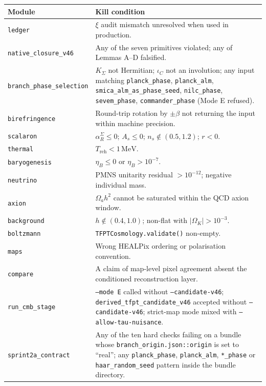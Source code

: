\documentclass[11pt,a4paper]{article}
\begin{document}
\begin{center}
\renewcommand{\arraystretch}{1.05}
\begin{tabularx}{\textwidth}{@{}p{}Y@{}}
\toprule
\textbf{Module} & \textbf{Kill condition} \\
\midrule
\texttt{ledger}        & \(\xi\) audit mismatch unresolved when used in production. \\
\texttt{native\_closure\_v46} & Any of the seven primitives violated; any of Lemmas A--D falsified. \\
\texttt{branch\_phase\_selection} & \(K_\Sigma\) not Hermitian; \(\iota_C\) not an involution; any input matching \texttt{planck\_phase}, \texttt{planck\_alm}, \texttt{smica\_alm\_as\_phase\_seed}, \texttt{nilc\_phase}, \texttt{sevem\_phase}, \texttt{commander\_phase} (Mode E refused). \\
\texttt{birefringence} & Round-trip rotation by \(\pm\beta\) not returning the input within machine precision. \\
\texttt{scalaron}      & \(\alpha_R^\Sigma\le 0\); \(A_s\le 0\); \(n_s\notin(0.5,1.2)\); \(r<0\). \\
\texttt{thermal}       & \(T_{\mathrm{reh}}<1\,\mathrm{MeV}\). \\
\texttt{baryogenesis}  & \(\eta_B\le 0\) or \(\eta_B>10^{-7}\). \\
\texttt{neutrino}      & PMNS unitarity residual \(>10^{-12}\); negative individual mass. \\
\texttt{axion}         & \(\Omega_a h^2\) cannot be saturated within the QCD axion window. \\
\texttt{background}    & \(h\notin(0.4,1.0)\); non-flat with \(|\Omega_K|>10^{-3}\). \\
\texttt{boltzmann}     & \texttt{TFPTCosmology.validate()} non-empty. \\
\texttt{maps}          & Wrong HEALPix ordering or polarisation convention. \\
\texttt{compare}       & A claim of map-level pixel agreement absent the conditioned reconstruction layer. \\
\texttt{run\_cmb\_stage} & \texttt{--mode E} called without \texttt{--candidate-v46}; \texttt{derived\_tfpt\_candidate\_v46} accepted without \texttt{--candidate-v46}; strict-map mode mixed with \texttt{--allow-tau-nuisance}. \\
\texttt{sprint2a\_contract} & Any of the ten hard checks failing on a bundle whose \texttt{branch\_origin.json::origin} is set to ``real''; any \texttt{planck\_phase}, \texttt{planck\_alm}, \texttt{*\_phase} or \texttt{haar\_random\_seed} pattern inside the bundle directory. \\
\bottomrule
\end{tabularx}
\end{center}
\end{document}
